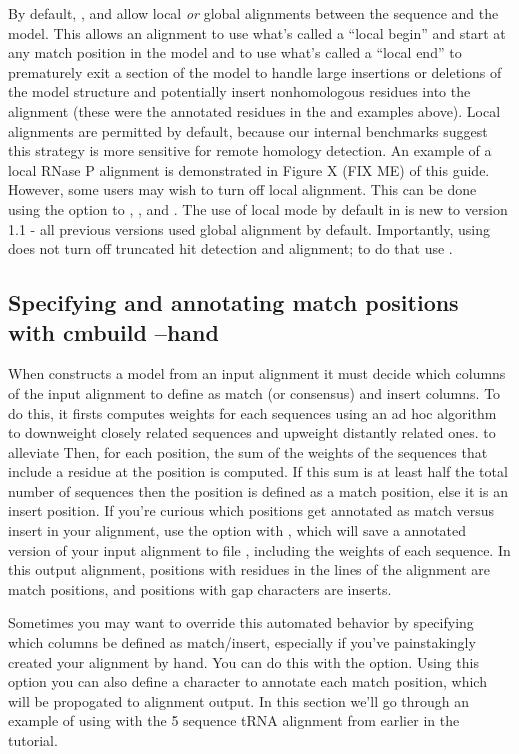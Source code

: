By default, ,  and  allow
local \emph{or} global alignments between the sequence and the
model. This allows an alignment to use what's called a ``local begin''
and start at any match position in the model and to use what's called
a ``local end'' to prematurely exit a section of the model to handle
large insertions or deletions of the model structure and potentially
insert nonhomologous residues into the alignment (these were the
\ccode{~} annotated residues in the  and 
examples above). Local alignments are permitted by default, because
our internal benchmarks suggest this strategy is more sensitive for
remote homology detection. An example of a local RNase P alignment is
demonstrated in Figure X (FIX ME) of this guide. However, some users
may wish to turn off local alignment. This can be done using the
 option to , , and
. The use of local mode by default in  is
new to version 1.1 - all previous versions used global alignment by
default. Importantly, using  does not turn off
truncated hit detection and alignment; to do that use
. 

\subsection{Specifying and annotating match positions with cmbuild --hand}

When  constructs a model from an input alignment it must
decide which columns of the input alignment to define as match (or
consensus) and insert columns. To do this, it firsts computes weights
for each sequences using an ad hoc algorithm to downweight closely
related sequences and upweight distantly related ones. to alleviate
Then, for each position, the sum of the weights of the sequences that
include a residue at the position is computed. If this sum is at least
half the total number of sequences then the position is defined as a
match position, else it is an insert position. If you're curious which
positions get annotated as match versus insert in your alignment, use
the  option with , which will save a
annotated version of your input alignment to file ,
including the weights of each sequence. In this output alignment,
positions with residues in the  lines of the alignment
are match positions, and positions with gap characters are inserts.

Sometimes you may want to override this automated behavior by
specifying which columns be defined as match/insert, especially if you've
painstakingly created your alignment by hand. You can do this with the
 option. Using this option you can also define a
character to annotate each match position, which will be propogated to
alignment output. In this section we'll go through an example of using
 with the 5 sequence tRNA alignment from earlier in the
tutorial.

